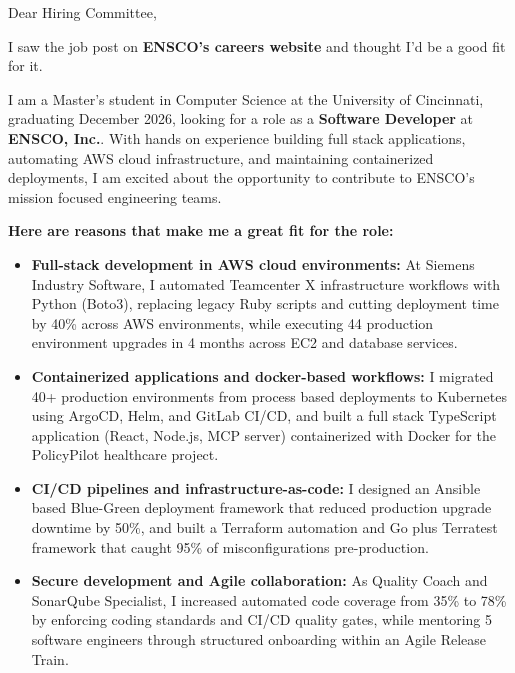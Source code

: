 \documentclass[11pt]{letter}
\date{}
\begin{document}
\begin{letter}{}

\opening{Dear Hiring Committee,}

I saw the job post on \textbf{ENSCO's careers website} and thought I'd be a good fit for it.

I am a Master's student in Computer Science at the University of Cincinnati, graduating December 2026, looking for a role as a \textbf{Software Developer} at \textbf{ENSCO, Inc.}. With hands on experience building full stack applications, automating AWS cloud infrastructure, and maintaining containerized deployments, I am excited about the opportunity to contribute to ENSCO's mission focused engineering teams.

\textbf{Here are reasons that make me a great fit for the role:}

\begin{itemize}[leftmargin=*, itemsep=0.45em]
    \item \textbf{Full-stack development in AWS cloud environments:} At Siemens Industry Software, I automated Teamcenter X infrastructure workflows with Python (Boto3), replacing legacy Ruby scripts and cutting deployment time by 40\% across AWS environments, while executing 44 production environment upgrades in 4 months across EC2 and database services.

    \item \textbf{Containerized applications and docker-based workflows:} I migrated 40+ production environments from process based deployments to Kubernetes using ArgoCD, Helm, and GitLab CI/CD, and built a full stack TypeScript application (React, Node.js, MCP server) containerized with Docker for the PolicyPilot healthcare project.

    \item \textbf{CI/CD pipelines and infrastructure-as-code:} I designed an Ansible based Blue-Green deployment framework that reduced production upgrade downtime by 50\%, and built a Terraform automation and Go plus Terratest framework that caught 95\% of misconfigurations pre-production.

    \item \textbf{Secure development and Agile collaboration:} As Quality Coach and SonarQube Specialist, I increased automated code coverage from 35\% to 78\% by enforcing coding standards and CI/CD quality gates, while mentoring 5 software engineers through structured onboarding within an Agile Release Train.
\end{itemize}


\end{letter}
\end{document}
